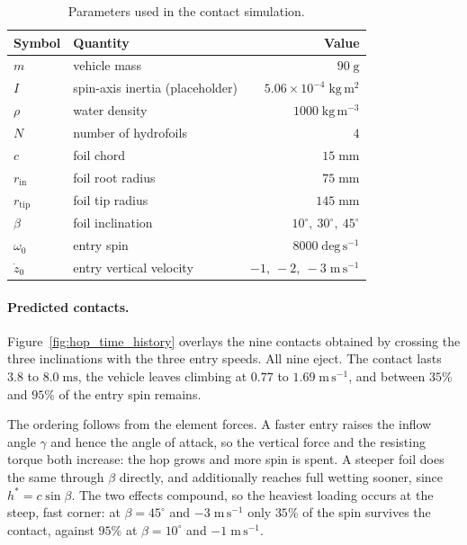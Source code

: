 \begin{table}[t]
    \centering
    \caption{Parameters used in the contact simulation.}
    \label{tab:sim_params}
    \begin{tabular}{llr}
        \toprule
        Symbol & Quantity & Value \\
        \midrule
        $m$                     & vehicle mass              & $90\;\mathrm{g}$ \\
        $I$                     & spin-axis inertia (placeholder) & $5.06\times10^{-4}\;\mathrm{kg\,m^{2}}$ \\
        $\rho$                  & water density             & $1000\;\mathrm{kg\,m^{-3}}$ \\
        $N$                     & number of hydrofoils      & $4$ \\
        $c$                     & foil chord                & $15\;\mathrm{mm}$ \\
        $r_{\mathrm{in}}$       & foil root radius          & $75\;\mathrm{mm}$ \\
        $r_{\mathrm{tip}}$      & foil tip radius           & $145\;\mathrm{mm}$ \\
        $\beta$                 & foil inclination          & $10^\circ,\ 30^\circ,\ 45^\circ$ \\
        $\omega_0$              & entry spin                & $8000\;\mathrm{deg\,s^{-1}}$ \\
        $\dot{z}_0$             & entry vertical velocity   & $-1,\ -2,\ -3\;\mathrm{m\,s^{-1}}$ \\
        \bottomrule
    \end{tabular}
\end{table}

\paragraph{Predicted contacts.}
Figure~\ref{fig:hop_time_history} overlays the nine contacts obtained by
crossing the three inclinations with the three entry speeds.  All nine eject.
The contact lasts $3.8$ to $8.0\;\mathrm{ms}$, the vehicle leaves climbing at
$0.77$ to $1.69\;\mathrm{m\,s^{-1}}$, and between $35\%$ and $95\%$ of the
entry spin remains.

The ordering follows from the element forces.  A faster entry raises the inflow
angle $\gamma$ and hence the angle of attack, so the vertical force and the
resisting torque both increase: the hop grows and more spin is spent.  A
steeper foil does the same through $\beta$ directly, and additionally reaches
full wetting sooner, since $h^{*} = c\sin\beta$.  The two effects compound, so
the heaviest loading occurs at the steep, fast corner: at $\beta = 45^\circ$
and $-3\;\mathrm{m\,s^{-1}}$ only $35\%$ of the spin survives the contact,
against $95\%$ at $\beta = 10^\circ$ and $-1\;\mathrm{m\,s^{-1}}$.

